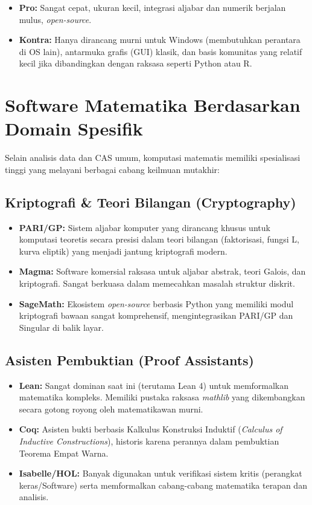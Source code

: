 \documentclass[11pt, a4paper, numbers=enddot, oneside]{scrbook}
\begin{document}
\begin{itemize}
    \item \textbf{Pro:} Sangat cepat, ukuran kecil, integrasi aljabar dan numerik berjalan mulus, \emph{open-source}.
    \item \textbf{Kontra:} Hanya dirancang murni untuk Windows (membutuhkan perantara di OS lain), antarmuka grafis (GUI) klasik, dan basis komunitas yang relatif kecil jika dibandingkan dengan raksasa seperti Python atau R.
\end{itemize}

\chapter{Software Matematika Berdasarkan Domain Spesifik}

Selain analisis data dan CAS umum, komputasi matematis memiliki spesialisasi tinggi yang melayani berbagai cabang keilmuan mutakhir:

\section{Kriptografi \& Teori Bilangan (Cryptography)}

\begin{itemize}
    \item \textbf{PARI/GP:} Sistem aljabar komputer yang dirancang khusus untuk komputasi teoretis secara presisi dalam teori bilangan (faktorisasi, fungsi L, kurva eliptik) yang menjadi jantung kriptografi modern.
    \item \textbf{Magma:} Software komersial raksasa untuk aljabar abstrak, teori Galois, dan kriptografi. Sangat berkuasa dalam memecahkan masalah struktur diskrit.
    \item \textbf{SageMath:} Ekosistem \emph{open-source} berbasis Python yang memiliki modul kriptografi bawaan sangat komprehensif, mengintegrasikan PARI/GP dan Singular di balik layar.
\end{itemize}

\section{Asisten Pembuktian (Proof Assistants)}

\begin{itemize}
    \item \textbf{Lean:} Sangat dominan saat ini (terutama Lean 4) untuk memformalkan matematika kompleks. Memiliki pustaka raksasa \emph{mathlib} yang dikembangkan secara gotong royong oleh matematikawan murni.
    \item \textbf{Coq:} Asisten bukti berbasis Kalkulus Konstruksi Induktif (\emph{Calculus of Inductive Constructions}), historis karena perannya dalam pembuktian Teorema Empat Warna.
    \item \textbf{Isabelle/HOL:} Banyak digunakan untuk verifikasi sistem kritis (perangkat keras/Software) serta memformalkan cabang-cabang matematika terapan dan analisis.
\end{itemize}
\end{document}
